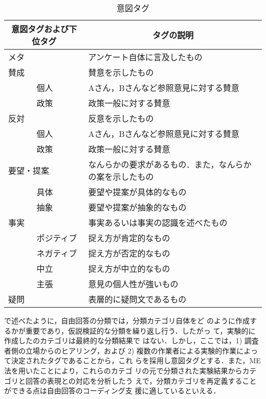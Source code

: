 \begin{table}[t]
\begin{center}
\leavevmode
\caption{意図タグ}
\label{tab:intention_tag}
\begin{tabular}{|ll|l|}
\hline
\multicolumn{2}{|c|}{意図タグおよび下位タグ}
&\multicolumn{1}{|c|}{タグの説明}
\\ \hline \hline
メタ & &アンケート自体に言及したもの \\ \hline
\multicolumn{2}{|l|}{賛成} &賛意を示したもの \\ \cline{3-3}
&個人 &Aさん，Bさんなど参照意見に対する賛意 \\ \cline{3-3}
&政策 &政策一般に対する賛意 \\ \hline
\multicolumn{2}{|l|}{反対} &反意を示したもの \\ \cline{3-3}
&個人 &Aさん，Bさんなど参照意見に対する賛意 \\ \cline{3-3}
&政策 &政策一般に対する賛意 \\ \hline
\multicolumn{2}{|l|}{要望・提案} &なんらかの要求があるもの．また，なんらかの案を示したもの \\ \cline{3-3}
&具体 &要望や提案が具体的なもの \\ \cline{3-3}
&抽象 &要望や提案が抽象的なもの \\ \hline
\multicolumn{2}{|l|}{事実} &事実あるいは事実の認識を述べたもの \\ \cline{3-3}
&ポジティブ &捉え方が肯定的なもの \\ \cline{3-3}
&ネガティブ &捉え方が否定的なもの \\ \cline{3-3}
&中立 &捉え方が中立的なもの \\ \cline{3-3}
&主張 &意見の個人性が強いもの \\ \hline
\multicolumn{2}{|l|}{疑問} &表層的に疑問文であるもの \\ \hline
\end{tabular}
\end{center}
\end{table}


で述べたように，自由回答の分類では，分類カテゴリ自体をど
のように作成するかが重要であり，仮説検証的な分類を繰り返し行う．したがっ
て，実験的に作成したのカテゴリは最終的な分類結果で
はない．しかし，ここでは，1) 調査者側の立場からのヒアリング，および 2) 
複数の作業者による実験的作業によって決定されたタグであることから，これ
らを採用し意図タグとする．また，ME法を用いたことにより，これらのカテゴ
リの元で分類された実験結果からカテゴリと回答の表現との対応を分析したう
えで，分類カテゴリを再定義することができる点は自由回答のコーディング支
援に適しているといえる．


